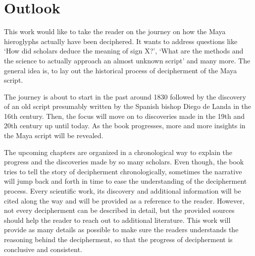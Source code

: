 \documentclass[../main.tex]{subfiles}
\begin{document}
\section{Outlook}
This work would like to take the reader on the journey on how the Maya hieroglyphs actually 
have been deciphered.
It wants to address questions like `How did scholars deduce the meaning of sign X?',
`What are the methods and the science to actually approach an almost unknown script' and many more.
The general idea is, to lay out the historical process of decipherment of the Maya script.

The journey is about to start in the past around 1830
followed by the discovery of an old script presumably written by the Spanish bishop Diego de Landa 
in the 16th century.
Then, the focus will move on to discoveries made in the 19th and 20th century up until today.
As the book progresses, more and more insights in the Maya script will be revealed.

The upcoming chapters are organized in a chronological way to explain the progress and the 
discoveries made by so many scholars.
Even though, the book tries to tell the story of decipherment chronologically, sometimes
the narrative will jump back and forth in time to ease the understanding of 
the decipherment process.
Every scientific work, its discovery and additional information will be cited along the way and 
will be provided as a reference to the reader.
However, not every decipherment can be described in detail, but the provided sources should help 
the reader to reach out to additional literature.
This work will provide as many details as possible to make sure the readers understands the 
reasoning behind the decipherment, so that the progress of decipherment is 
conclusive and consistent.
\end{document}
